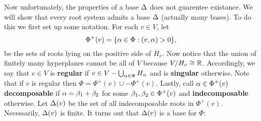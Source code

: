 \documentclass[12pt,reqno,oneside]{amsart}
\begin{document}
    Now unfortunately, the properties of a base $\Delta$ does not guarentee existance. We will show that every root system admits a base $\Delta$ (actually many bases). To do this we first set up some notation. For each $v \in V$, let
    \[
        \Phi^{+}(v) = \{\alpha \in \Phi:(v,\alpha) > 0\},
    \]
    be the sets of roots lying on the positive side of $H_{v}$. Now notice that the union of finitely many hyperplanes cannot be all of $V$ because $V/H_{v} \cong \mathbb{R}$. Accordingly, we say that $v \in V$ is \textbf{regular} if $v \in V-\bigcup_{\alpha \in \Phi}H_{\alpha}$ and is \textbf{singular} otherwise. Note that if $v$ is regular then $\Phi = \Phi^{+}(v)\cup -\Phi^{+}(v)$. Lastly, call $\alpha \in \Phi^{+}(v)$ \textbf{decomposable} if $\alpha = \beta_{1}+\beta_{2}$ for some $\beta_{1},\beta_{2} \in \Phi^{+}(v)$ and \textbf{indecomposable} otherwise. Let $\Delta(v)$ be the set of all indecomposable roots in $\Phi^{+}(v)$. Necessarily, $\Delta(v)$ is finite. It turns out that $\Delta(v)$ is a base for $\Phi$:
\end{document}
